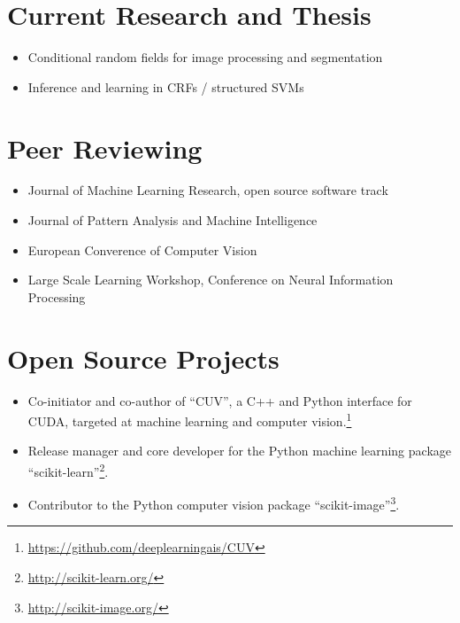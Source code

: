 \documentclass[a4paper,11pt]{article}
\begin{document}
\section{Current Research and Thesis}
\begin{itemize}
    \item Conditional random fields for image processing and segmentation
    \item Inference and learning in CRFs / structured SVMs
\end{itemize}

\section{Peer Reviewing}
\begin{itemize}
    \item Journal of Machine Learning Research, open source software track
    \item Journal of Pattern Analysis and Machine Intelligence
    \item European Converence of Computer Vision
    \item Large Scale Learning Workshop, Conference on Neural Information Processing
\end{itemize}

\section{Open Source Projects}
\begin{itemize}
    \item Co-initiator and co-author of ``CUV'', a C++ and Python interface for CUDA,
        targeted at machine learning and computer vision.\footnote{\url{https://github.com/deeplearningais/CUV}}
    \item Release manager and core developer for the Python machine learning package ``scikit-learn''\footnote{\url{http://scikit-learn.org/}}.
    \item Contributor to the Python computer vision package ``scikit-image''\footnote{\url{http://scikit-image.org/}}.
\end{itemize}
\pagebreak

\begin{publications}
\end{publications}
\end{document}
